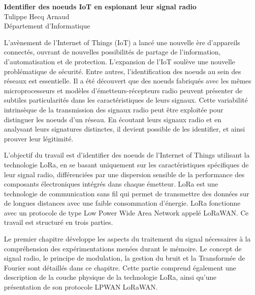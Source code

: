 \documentclass[a4paper,11pt]{article}
\begin{document}
\begin{center}
    \LARGE \textbf{Identifier des noeuds IoT en espionant leur signal radio} \\
    \vspace{0.2cm}
    \large Tulippe Hecq Arnaud \\
    \normalsize Département d'Informatique \\
    \vspace{0.5cm}
\end{center}


\noindent L'avènement de l'Internet of Things (IoT) a lancé une nouvelle ère d'appareils connectés, ouvrant de nouvelles possibilités de partage de l'information, d'automatisation et de protection. L'expansion de l'IoT soulève une nouvelle problématique de sécurité. Entre autres, l'identification des noeuds au sein des réseaux est essentielle. Il a été découvert que des noeuds fabriqués avec les mêmes microprocesseurs et modèles d'émetteurs-récepteurs radio peuvent présenter de subtiles particularités dans les caractéristiques de leurs signaux. Cette variabilité intrinsèque de la transmission des signaux radio peut être exploitée pour distinguer les noeuds d’un réseau. En écoutant leurs signaux radio et en analysant leurs signatures distinctes, il devient possible de les identifier, et ainsi prouver leur légitimité.

\vspace{0.2cm}
\noindent L'objectif du travail est d'identifier des noeuds de l'Internet of Things utilisant la technologie LoRa, en se basant uniquement sur les caractéristiques spécifiques de leur signal radio, différenciées par une dispersion sensible de la performance des composants électroniques intégrés dans chaque émetteur. LoRa est une technologie de communication sans fil qui permet de transmettre des données sur de longues distances avec une faible consommation d'énergie. LoRa fonctionne avec un protocole de type Low Power Wide Area Network appelé LoRaWAN. Ce travail est structuré en trois parties.

\vspace{0.2cm}

\noindent Le premier chapitre développe les aspects du traitement du signal nécessaires à la compréhension des expérimentations menées durant le mémoire. Le concept de signal radio, le principe de modulation, la gestion du bruit et la Transformée de Fourier sont détaillés dans ce chapitre. Cette partie comprend également une description de la couche physique de la technologie LoRa, ainsi qu'une présentation de son protocole LPWAN LoRaWAN.
\end{document}
